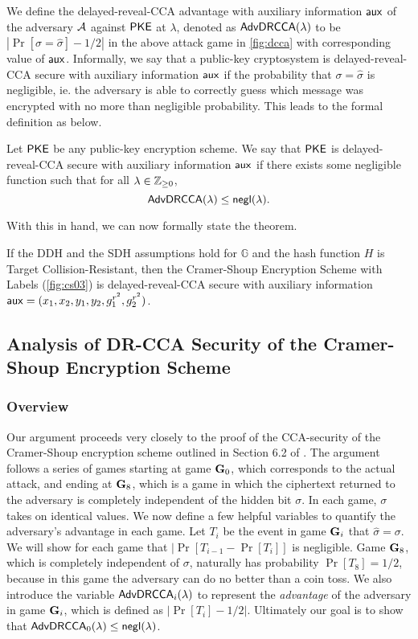 We define the delayed-reveal-CCA advantage with auxiliary information $\mathsf{aux}$ of the adversary $\mathcal{A}$ against $\mathsf{PKE}$ at $\lambda$, denoted as $\mathsf{AdvDRCCA}(\lambda)$ to be $|\Pr[\sigma = \hat{\sigma}] - 1/2|$ in the above attack game in \cref{fig:dcca} with corresponding value of $\mathsf{aux}$. Informally, we say that a public-key cryptosystem is delayed-reveal-CCA secure with auxiliary information $\mathsf{aux}$ if the probability that $\sigma = \hat{\sigma}$ is negligible, ie. the adversary is able to correctly guess which message was encrypted with no more than negligible probability. This leads to the formal definition as below.

\begin{definition}
	Let $\mathsf{PKE}$ be any public-key encryption scheme. We say that $\mathsf{PKE}$ is delayed-reveal-CCA secure with auxiliary information $\mathsf{aux}$ if there exists some negligible function such that for all $\lambda\in\mathbb{Z}_{\geq 0}$, $$\mathsf{AdvDRCCA}(\lambda)\leq\mathsf{negl}(\lambda).$$
\end{definition}

With this in hand, we can now formally state the theorem.

\begin{theorem}
	\label{thm:drcca-cs}
	If the DDH and the SDH assumptions hold for $\mathbb{G}$ and the hash function $H$ is Target Collision-Resistant, then the Cramer-Shoup Encryption Scheme with Labels (\cref{fig:cs03}) is delayed-reveal-CCA secure with auxiliary information $\mathsf{aux} = (x_1,x_2,y_1,y_2,g_1^{r^2},g_2^{r^2})$.
\end{theorem}

\subsection{Analysis of DR-CCA Security of the Cramer-Shoup Encryption Scheme}

\subsubsection{Overview}

Our argument proceeds very closely to the proof of the CCA-security of the Cramer-Shoup encryption scheme outlined in Section 6.2 of \cite{cs01}. The argument follows a series of games starting at game $\mathbf{G}_0$, which corresponds to the actual attack, and ending at $\mathbf{G}_8$, which is a game in which the ciphertext returned to the adversary is completely independent of the hidden bit $\sigma$. In each game, $\sigma$ takes on identical values. We now define a few helpful variables to quantify the adversary's advantage in each game. Let $T_i$ be the event in game $\mathbf{G}_i$ that $\hat{\sigma}=\sigma$. We will show for each game that $|\Pr[T_{i-1} - \Pr[T_i]]$ is negligible. Game $\mathbf{G}_8$, which is completely independent of $\sigma$, naturally has probability $\Pr[T_8]=1/2$, because in this game the adversary can do no better than a coin toss. We also introduce the variable $\mathsf{AdvDRCCA}_i(\lambda)$ to represent the \textit{advantage} of the adversary in game $\mathbf{G}_i$, which is defined as $|\Pr[T_i]-1/2|$. Ultimately our goal is to show that $\mathsf{AdvDRCCA}_0(\lambda)\leq\mathsf{negl}(\lambda)$.

